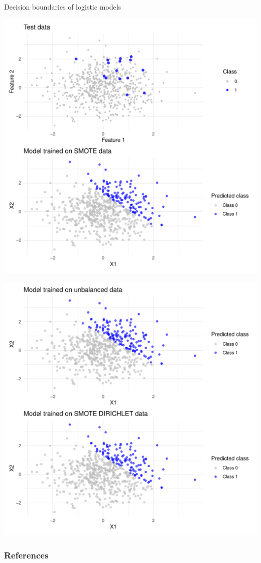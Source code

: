 \documentclass{beamer}
\begin{document}
  \begin{frame}{Decision boundaries of logistic models}
   \centering
    \begin{minipage}{0.48\textwidth}
        \centering
        \includegraphics[width=\textwidth]{images/compare_predictions_1.pdf}
    \end{minipage}
    \hfill
    \begin{minipage}{0.48\textwidth}
        \centering
        \includegraphics[width=\textwidth]{images/compare_predictions_2.pdf}
    \end{minipage}   
  \end{frame}


\begin{frame}
  \frametitle{References}
  \nocite{*}
  \printbibliography
\end{frame}
\end{document}
